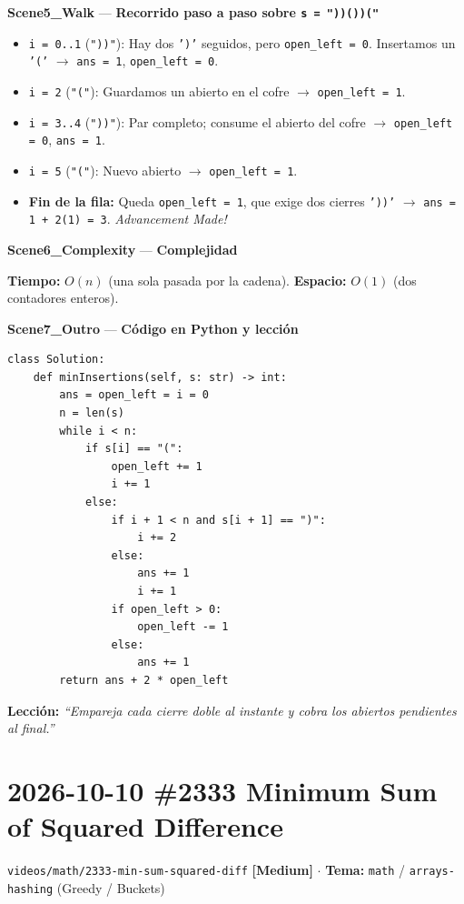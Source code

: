 \documentclass[letterpaper,10pt]{article}
\newcommand{\scene}[2]{\noindent\textbf{\textcolor{mcaqua}{#1}} --- \textbf{#2}\par\vspace{1pt}}
\newcommand{\folder}[1]{\texttt{\textcolor{mcgreen}{#1}}}
\newcommand{\badge}[2]{\textbf{\textcolor{#1}{[#2]}}}
\begin{document}
\begin{shaded}
\scene{Scene5\_Walk}{Recorrido paso a paso sobre \texttt{s = "))())("}}
\begin{itemize}\setlength{\itemsep}{1pt}
  \item \texttt{i = 0..1} (\texttt{"))"}): Hay dos \texttt{')'} seguidos, pero \texttt{open\_left = 0}. Insertamos un \texttt{'('} $\to$ \texttt{ans = 1}, \texttt{open\_left = 0}.
  \item \texttt{i = 2} (\texttt{"("}): Guardamos un abierto en el cofre $\to$ \texttt{open\_left = 1}.
  \item \texttt{i = 3..4} (\texttt{"))"}): Par completo; consume el abierto del cofre $\to$ \texttt{open\_left = 0}, \texttt{ans = 1}.
  \item \texttt{i = 5} (\texttt{"("}): Nuevo abierto $\to$ \texttt{open\_left = 1}.
  \item \textbf{Fin de la fila:} Queda \texttt{open\_left = 1}, que exige dos cierres \texttt{'))'} $\to$ \texttt{ans = 1 + 2(1) = 3}. \textit{Advancement Made!}
\end{itemize}

\scene{Scene6\_Complexity}{Complejidad}
\textbf{Tiempo:} $O(n)$ (una sola pasada por la cadena). \quad \textbf{Espacio:} $O(1)$ (dos contadores enteros).
\end{shaded}

\scene{Scene7\_Outro}{C\'odigo en Python y lecci\'on}
\begin{Verbatim}[frame=single,fontsize=\small]
class Solution:
    def minInsertions(self, s: str) -> int:
        ans = open_left = i = 0
        n = len(s)
        while i < n:
            if s[i] == "(":
                open_left += 1
                i += 1
            else:
                if i + 1 < n and s[i + 1] == ")":
                    i += 2
                else:
                    ans += 1
                    i += 1
                if open_left > 0:
                    open_left -= 1
                else:
                    ans += 1
        return ans + 2 * open_left
\end{Verbatim}
\textbf{Lecci\'on:} \textit{``Empareja cada cierre doble al instante y cobra los abiertos pendientes al final.''}

\newpage

\section{2026-10-10 \textbar{} \#2333 Minimum Sum of Squared Difference}
\folder{videos/math/2333-min-sum-squared-diff} \hfill \badge{mcgold}{Medium} $\cdot$ \textbf{Tema:} \texttt{math} / \texttt{arrays-hashing} (Greedy / Buckets)
\end{document}
